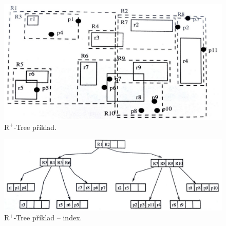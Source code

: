 \begin{figure}[H]
    \centering
    \includegraphics[width=0.85\linewidth]{r_tree_plus_1.pdf}
    \caption{$\text{R}^+$-Tree příklad.}
\end{figure}

\begin{figure}[H]
    \centering
    \includegraphics[width=1\linewidth]{r_tree_plus_2.pdf}
    \caption{$\text{R}^+$-Tree příklad -- index.}
\end{figure}
